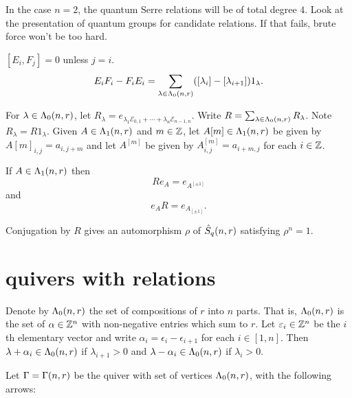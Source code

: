 \documentclass[a4paper, 11pt]{report}
\begin{document}
\begin{lemma}[quantum Serre relations: $n=2$]
{\color{gray} In the case $n=2$, the quantum Serre relations will be of total degree $4$. Look at the presentation of quantum groups for candidate relations. If that fails, brute force won't be too hard.}
\end{lemma}

\begin{lemma}
$[E_i, F_j] = 0$ unless $j=i$.
\begin{equation*}
E_i F_i - F_i E_i = \sum_{\lambda\in\Lambda_0(n,r)} ([\lambda_i] - [\lambda_{i+1}])1_\lambda.
\end{equation*}
\end{lemma}


{\color{gray}
For $\lambda\in\Lambda_0(n,r)$, let $R_\lambda = e_{\lambda_1\mathcal{E}_{0,1}+\cdots +\lambda_n\mathcal{E}_{n-1,n}}$. Write $R = \sum_{\lambda\in\Lambda_0(n,r)} R_\lambda$. Note $R_\lambda = R 1_\lambda$. Given $A\in\Lambda_1(n,r)$ and $m\in\mathbb{Z}$, let $A[m]\in\Lambda_1(n,r)$ be given by $A[m]_{i,j} = a_{i,j+m}$ and let $A^{[m]}$ be given by $A^{[m]}_{i,j} = a_{i+m,j}$ for each $i\in\mathbb{Z}$.

\begin{lemma}[Shifting]
If $A\in\Lambda_1(n,r)$ then
\begin{equation*}
R e_A = e_{A^{[\pm 1]}}
\end{equation*}
and
\begin{equation*}
e_A R = e_{A_{[\pm 1]}}.
\end{equation*}
\end{lemma}

Conjugation by $R$ gives an automorphism $\rho$ of $\hat{S}_q(n,r)$ satisfying $\rho^n = 1$.
}

\section{quivers with relations}

Denote by $\Lambda_0(n,r)$ the set of compositions of $r$ into $n$ parts. That is, $\Lambda_0(n,r)$ is the set of $\alpha\in\mathbb{Z}^n$ with non-negative entries which sum to $r$. Let $\varepsilon_i\in\mathbb{Z}^n$ be the $i$th elementary vector and write $\alpha_i = \epsilon_i  -\epsilon_{i+1}$ for each $i\in [1,n]$. Then $\lambda +\alpha_i\in\Lambda_0(n,r)$ if $\lambda_{i+1}>0$ and $\lambda -\alpha_i\in\Lambda_0(n,r)$ if $\lambda_i >0$.

Let $\Gamma=\Gamma(n,r)$ be the quiver with set of vertices $\Lambda_0(n,r)$, with the following arrows:
\end{document}
